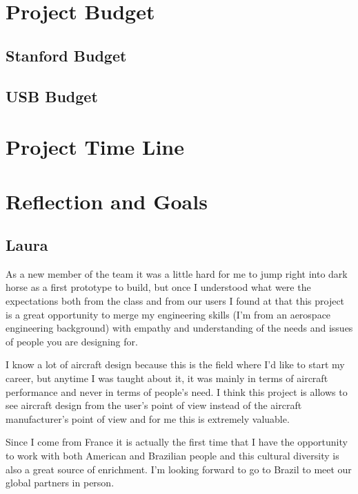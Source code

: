 \section{Project Budget}
\subsection{Stanford Budget}
\subsection{USB Budget}
 

\section{Project Time Line}
\section{Reflection and Goals}

\subsection{Laura}
As a new member of the team it was a little hard for me to jump right into dark horse as a first prototype to build, but once I understood what were the expectations both from the class and from our users I found at that this project is a great opportunity to merge my engineering skills (I’m from an aerospace engineering background) with empathy and understanding of the needs and issues of people you are designing for. 

I know a lot of aircraft design because this is the field where I’d like to start my career, but anytime I was taught about it, it was mainly in terms of aircraft performance and never in terms of people’s need. I think this project is allows to see aircraft design from the user’s point of view instead of the aircraft manufacturer’s point of view and for me this is extremely valuable. 

Since I come from France it is actually the first time that I have the opportunity to work with both American and Brazilian people and this cultural diversity is also a great source of enrichment. I’m looking forward to go to Brazil to meet our global partners in person. 

